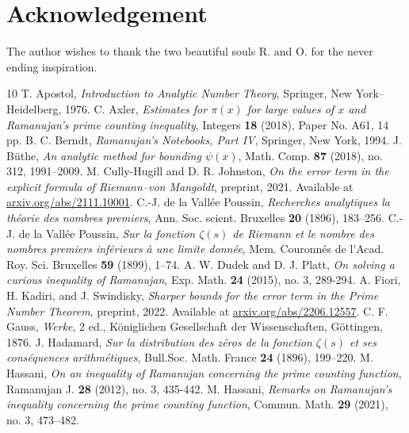 \documentclass[a4paper,12pt]{amsart}
\theoremstyle{definition}
\theoremstyle{remark}
\begin{document}
\section*{Acknowledgement}

The author wishes to thank the two beautiful souls R. and O. for the never ending inspiration.

\begin{thebibliography}{10}
 T. Apostol, {\it Introduction to Analytic Number Theory}, Springer, New York--Heidelberg, 1976.
 C. Axler, \textit{Estimates for $\pi(x)$ for large values of $x$ and Ramanujan's prime counting inequality}, Integers \textbf{18} (2018), Paper No. A61, 14 pp.
 B. C. Berndt, {\it Ramanujan's Notebooks, Part IV}, Springer, New York, 1994.
 J. Büthe, \textit{An analytic method for bounding $\psi(x)$}, Math. Comp. \textbf{87} (2018), no. 312, 1991--2009.
 M. Cully-Hugill and D. R. Johnston, \textit{On the error term in the explicit formula of Riemann--von Mangoldt}, preprint, 2021. Available at \url{arxiv.org/abs/2111.10001}.
 C.-J. de la Vallée Poussin, \textit{Recherches analytiques la th\'{e}orie des nombres premiers}, Ann. Soc. scient. Bruxelles \textbf{20} (1896), 183--256.
 C.-J. de la Vallée Poussin, \textit{Sur la fonction $\zeta(s)$ de Riemann et le nombre des nombres premiers inf\'{e}rieurs \`{a} une limite donn\'{e}e}, Mem. Couronn\'{e}s de l'Acad. Roy. Sci. Bruxelles \textbf{59} (1899), 1--74.
 A. W. Dudek and D. J. Platt, \textit{On solving a curious inequality of Ramanujan}, Exp. Math. {\bf 24} (2015), no. 3, 289-294.
 A. Fiori, H. Kadiri, and J. Swindisky, \textit{Sharper bounds for the error term in the Prime Number Theorem}, preprint, 2022. Available at \url{arxiv.org/abs/2206.12557}.
 C. F. Gauss, \textit{Werke}, 2 ed., Königlichen Gesellschaft der Wissenschaften, Göttingen, 1876.
 J. Hadamard, \textit{Sur la distribution des z\'{e}ros de la fonction $\zeta(s)$ et ses cons\'{e}quences arithm\'{e}tiques}, Bull.Soc. Math. France \textbf{24} (1896), 199--220. 
 M. Hassani, \textit{On an inequality of Ramanujan concerning the prime counting function}, Ramanujan J. {\bf 28} (2012), no. 3, 435-442.
 M. Hassani, \textit{Remarks on Ramanujan's inequality concerning the prime counting function}, Commun. Math. \textbf{29} (2021), no. 3, 473--482.

\end{thebibliography}
\end{document}

